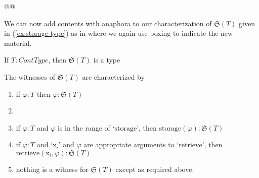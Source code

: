 
@@

We can now add contents with anaphora to
our characterization of $\mathfrak{S}(T)$ given in
(\ref{ex:storage-type}) as in \nexteg{} where we again use boxing to
indicate the new material.
\begin{ex} 
\begin{subex} 
 
\item If $T:\textit{ContType}$, then $\mathfrak{S}(T)$ is a type 
 
\item The witnesses of $\mathfrak{S}(T)$ are characterized by
  \begin{enumerate} 
 
  \item if $\varphi:T$ then $\varphi:\mathfrak{S}(T)$

    
  \item {}
 
  \item if $\varphi:T$ and $\varphi$ is in the range of `$\mathrm{storage}$', then
    $\mathrm{storage}(\varphi):\mathfrak{S}(T)$

  \item if $\varphi:T$ and `x$_i$' and $\varphi$ are appropriate
    arguments to `$\mathrm{retrieve}$', then
    $\mathrm{retrieve}(\text{x}_i,\varphi):\mathfrak{S}(T)$
    
  \item nothing is a witness for $\mathfrak{S}(T)$ except as required above.
 
  \end{enumerate} 
  
 
\end{subex} 
\label{ex:storage-anaph-type}   
\end{ex}

